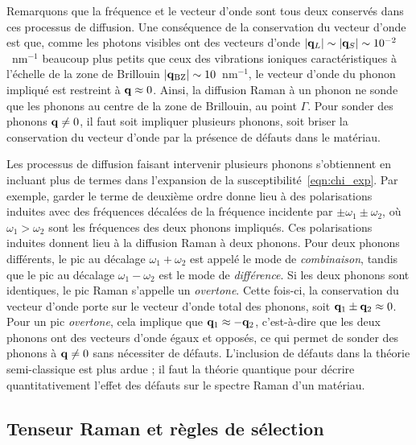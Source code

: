 Remarquons que la fréquence et le vecteur d'onde sont tous deux conservés dans ces processus de diffusion. Une conséquence de la conservation du vecteur d'onde est que, comme les photons visibles ont des vecteurs d'onde $|\mathbf{q}_L|\sim|\mathbf{q}_S|\sim 10^{-2}$~nm$^{-1}$ beaucoup plus petits que ceux des vibrations ioniques caractéristiques à l'échelle de la zone de Brillouin $|\mathbf{q}_\text{BZ}|\sim 10$~nm$^{-1}$, le vecteur d'onde du phonon impliqué est restreint à $\mathbf{q}\approx 0$. Ainsi, la diffusion Raman à un phonon ne sonde que les phonons au centre de la zone de Brillouin, au point $\Gamma$. Pour sonder des phonons $\mathbf{q}\neq 0$, il faut soit impliquer plusieurs phonons, soit briser la conservation du vecteur d'onde par la présence de défauts dans le matériau.

Les processus de diffusion faisant intervenir plusieurs phonons s'obtiennent en incluant plus de termes dans l'expansion de la susceptibilité~\eqref{eqn:chi_exp}. Par exemple, garder le terme de deuxième ordre donne lieu à des polarisations induites avec des fréquences décalées de la fréquence incidente par $\pm\omega_1\pm\omega_2$, où $\omega_1 > \omega_2$ sont les fréquences des deux phonons impliqués. Ces polarisations induites donnent lieu à la diffusion Raman à deux phonons. Pour deux phonons différents, le pic au décalage $\omega_1+\omega_2$ est appelé le mode de \textit{combinaison}, tandis que le pic au décalage $\omega_1-\omega_2$ est le mode de \textit{différence}. Si les deux phonons sont identiques, le pic Raman s'appelle un \textit{overtone}. Cette fois-ci, la conservation du vecteur d'onde porte sur le vecteur d'onde total des phonons, soit $\mathbf{q}_1\pm\mathbf{q}_2\approx 0$. Pour un pic \textit{overtone}, cela implique que $\mathbf{q}_1\approx-\mathbf{q}_2$, c'est-à-dire que les deux phonons ont des vecteurs d'onde égaux et opposés, ce qui permet de sonder des phonons à $\mathbf{q}\neq 0$ sans nécessiter de défauts. L'inclusion de défauts dans la théorie semi-classique est plus ardue ; il faut la théorie quantique pour décrire quantitativement l'effet des défauts sur le spectre Raman d'un matériau.

\subsection{Tenseur Raman et règles de sélection}

